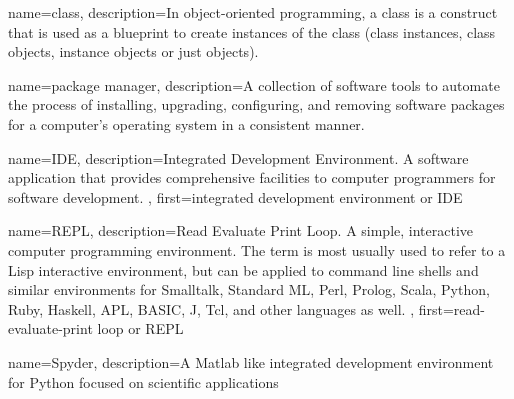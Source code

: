 {
    name=class,
    description={In object-oriented programming, a class is a construct that is used as a blueprint to create instances of the class (class instances, class objects, instance objects or just objects). \cite{website:wikipedia} }
}

{
    name=package manager,
    description={A collection of software tools to automate the process of installing, upgrading, configuring, and removing software packages for a computer's operating system in a consistent manner. \cite{website:wikipedia} }
}

{
    name=IDE,
    description={Integrated Development Environment. A software application that provides comprehensive facilities to computer programmers for software development.\cite{website:wikipedia} },
    first=integrated development environment or IDE
}

{
    name=REPL,
    description={Read Evaluate Print Loop. A simple, interactive computer programming environment. The term is most usually used to refer to a Lisp interactive environment, but can be applied to command line shells and similar environments for Smalltalk, Standard ML, Perl, Prolog, Scala, Python, Ruby, Haskell, APL, BASIC, J, Tcl, and other languages as well. \cite{website:wikipedia} },
    first=read-evaluate-print loop or REPL
}

{
    name=Spyder,
    description={A Matlab like integrated development environment for Python focused on scientific applications}
}

